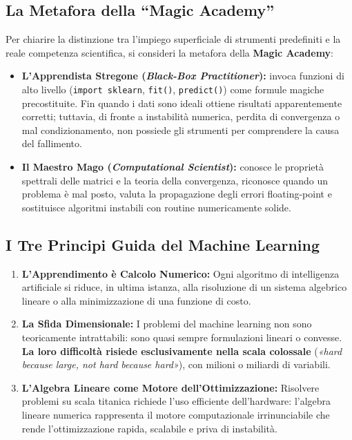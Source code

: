 \subsection{La Metafora della ``Magic Academy''}
Per chiarire la distinzione tra l'impiego superficiale di strumenti predefiniti e la reale competenza scientifica, si consideri la metafora della \textbf{Magic Academy}:
\begin{itemize}
    \item \textbf{L'Apprendista Stregone (\textit{Black-Box Practitioner}):} invoca funzioni di alto livello (\texttt{import sklearn}, \texttt{fit()}, \texttt{predict()}) come formule magiche precostituite. Fin quando i dati sono ideali ottiene risultati apparentemente corretti; tuttavia, di fronte a instabilit\`a numerica, perdita di convergenza o mal condizionamento, non possiede gli strumenti per comprendere la causa del fallimento.
    \item \textbf{Il Maestro Mago (\textit{Computational Scientist}):} conosce le propriet\`a spettrali delle matrici e la teoria della convergenza, riconosce quando un problema \`e mal posto, valuta la propagazione degli errori floating-point e sostituisce algoritmi instabili con routine numericamente solide.
\end{itemize}

\subsection{I Tre Principi Guida del Machine Learning}
\begin{enumerate}
    \item \textbf{L'Apprendimento \`e Calcolo Numerico:} Ogni algoritmo di intelligenza artificiale si riduce, in ultima istanza, alla risoluzione di un sistema algebrico lineare o alla minimizzazione di una funzione di costo.
    \item \textbf{La Sfida Dimensionale:} I problemi del machine learning non sono teoricamente intrattabili: sono quasi sempre formulazioni lineari o convesse. \textbf{La loro difficolt\`a risiede esclusivamente nella scala colossale} (\textit{«hard because large, not hard because hard»}), con milioni o miliardi di variabili.
    \item \textbf{L'Algebra Lineare come Motore dell'Ottimizzazione:} Risolvere problemi su scala titanica richiede l'uso efficiente dell'hardware: l'algebra lineare numerica rappresenta il motore computazionale irrinunciabile che rende l'ottimizzazione rapida, scalabile e priva di instabilit\`a.
\end{enumerate}

